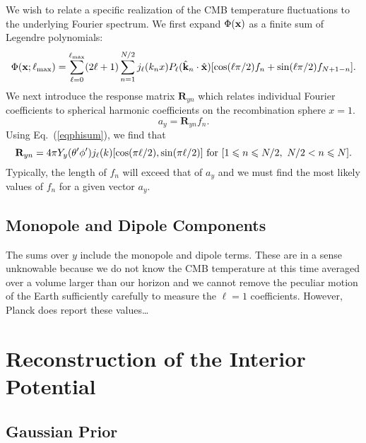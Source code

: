 \documentclass[useAMS,usenatbib,a4paper]{mn2e}
\begin{document}
We wish to relate a specific realization of the CMB temperature
fluctuations to the underlying Fourier  spectrum. We first expand
$\Phi({\bf x})$ as a finite sum of Legendre polynomials:
\begin{equation}
\Phi({\bf x;\ell_{\rm max}})=\sum_{\ell=0} ^{\ell_{\rm max}}(2\ell+1)\sum_{n=1}^{N/2}j_{\ell}(k_nx)P_{\ell}({\hat{\bf k}}_n\cdot{\hat{\bf x}})[\cos(\ell\pi/2)f_n+\sin(\ell\pi/2)f_{N+1-n}].
\label{eqphisum}
\end{equation}
We next introduce the response matrix ${\mathbf R}_{yn}$ which relates
individual Fourier coefficients to spherical harmonic coefficients on
the recombination sphere $x=1$.
\begin{equation}
a_y={\mathbf R}_{yn}f_n.
\end{equation}
Using Eq.~(\ref{eqphisum}), we find that
\begin{equation}
\mathbf{R}_{yn}=4\pi Y_y(\theta'\phi')j_\ell(k)[\cos(\pi\ell/2),\sin(\pi\ell/2)]\ {\rm for}\ [1\le n\le N/2,\ N/2<n\le N].
\end{equation}
Typically, the length of $f_n$ will exceed that of $a_y$ and we must
find the most likely values of $f_n$ for a given vector $a_y$.

\subsection{Monopole and Dipole Components}

The sums over $y$ include the monopole and dipole terms. These are in
a sense unknowable because we do not know the CMB temperature at this
time averaged over a volume larger than our horizon and we cannot
remove the peculiar motion of the Earth sufficiently carefully to
measure the $\ell=1$ coefficients. However, Planck does report these
values\dots



\section{Reconstruction of the Interior Potential}

\subsection{Gaussian Prior}
\end{document}

